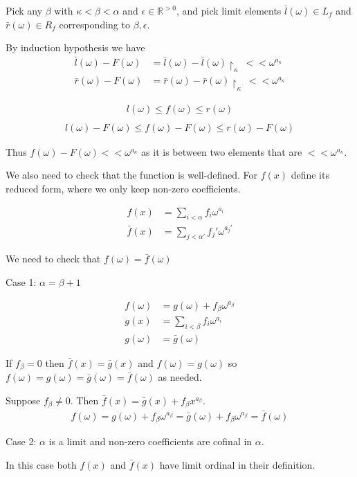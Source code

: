 \documentclass{article}
\newcommand{\R}{\mathbb{R}}
\newcommand{\w}{\omega}
\newcommand{\midr}[1]{\restriction_{#1}}
\begin{document}
Pick any $\beta$ with $\kappa < \beta < \alpha$ and $\epsilon \in \R^{>0}$,
and pick limit elements $\bar l(\w) \in L_f$ and $\bar r(\w) \in R_f$ corresponding to $\beta, \epsilon$.

By induction hypothesis we have 
\begin{align*}
	\bar l(\w) - F(\w) &= \bar l(\w) - \bar l(\w)\midr\kappa \ <<  \w^{a_\kappa} \\
	\bar r(\w) - F(\w) &= \bar r(\w) - \bar r(\w)\midr\kappa \ <<  \w^{a_\kappa}
\end{align*}

\begin{align*}
	l(\w) \leq f(\w) \leq r(\w) \\
\end{align*}
\begin{align*}
	l(\w) - F(\w) \leq f(\w) - F(\w) \leq r(\w) - F(\w)
\end{align*}
 
Thus $f(\w) - F(\w) << \w^{a_\kappa}$ as it is between two elements that are $<<  \w^{a_\kappa}$.

We also need to check that the function is well-defined. For $f(x)$ define its reduced form, where we only keep non-zero coefficients.

\begin{align*}
	f(x) &= \sum_{i < \alpha} f_i \w^{a_i} \\
	\bar f(x) &= \sum_{j < \alpha'} f_j' \w^{a_j'}
\end{align*}

We need to check that $f(\w) = \bar f(\w)$

Case 1: $\alpha = \beta + 1$

\begin{align*}
	f(\w) &= g(\w) + f_\beta \w^{a_\beta} \\
	g(x) &= \sum_{i < \beta} f_i \w^{a_i} \\
	g(\w) &= \bar g(\w)
\end{align*}

If $f_\beta = 0$ then $\bar f(x) = \bar g(x)$ and $f(\w) = g(\w)$ so $f(\w) = g(\w) = \bar g(\w) = \bar f(\w)$ as needed.

Suppose $f_\beta \neq 0$. Then $\bar f(x) = \bar g(x) + f_\beta x^{a_\beta}$.
\begin{align*}
	f(\w) = g(\w) + f_\beta \w^{a_\beta} = \bar g(\w) + f_\beta \w^{a_\beta} = \bar f(\w)
\end{align*}

Case 2: $\alpha$ is a limit and non-zero coefficients are cofinal in $\alpha$.

In this case both $f(x)$ and $\bar f(x)$ have limit ordinal in their definition.
\end{document}
